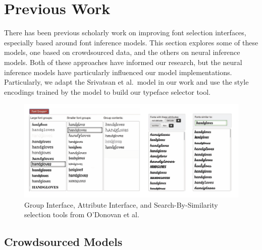 \section{Previous Work}

There has been previous scholarly work on improving font selection interfaces, especially based around font inference models. This section explores some of these models, one based on crowdsourced data, and the others on neural inference models. Both of these approaches have informed our research, but the neural inference models have particularly influenced our model implementations. Particularly, we adapt the Srivatsan et al.\ model \cite{srivatsan2020} in our work and use the style encodings trained by the model to build our typeface selector tool.

\begin{figure}
    \centering
    \includegraphics[width=1\textwidth]{images/odonovan-interfaces.png}
    \caption{Group Interface, Attribute Interface, and Search-By-Similarity selection tools from O'Donovan et al.\ \cite{odonovan2014}}
    \label{fig:odonovan-interfaces}
\end{figure}

\subsection{Crowdsourced Models}

